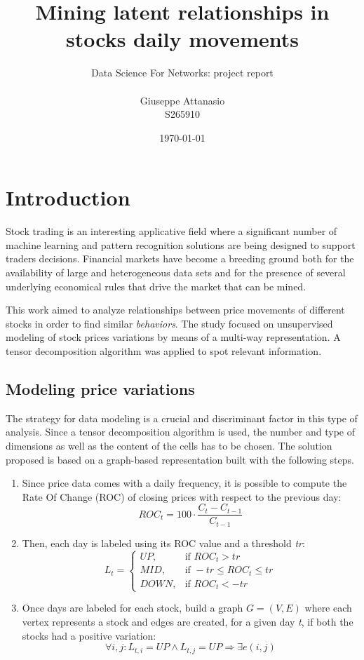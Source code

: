 \documentclass[12pt]{extarticle}
\title{Mining latent relationships in stocks daily movements}
\author{Data Science For Networks: project report\\\\Giuseppe Attanasio\\ S265910}
\date{\today}
\begin{document}
\maketitle
\newpage

\section{Introduction}

Stock trading is an interesting applicative field where a significant number of machine learning and pattern recognition solutions are being designed to support traders decisions. Financial markets have become a breeding ground both for the availability of large and heterogeneous data sets and for the presence of several underlying economical rules that drive the market that can be mined. 

This work aimed to analyze relationships between price movements of different stocks in order to find similar \textit{behaviors}. The study focused on unsupervised modeling of stock prices variations by means of a multi-way representation. A tensor decomposition algorithm was applied to spot relevant information. 

\subsection{Modeling price variations}

The strategy for data modeling is a crucial and discriminant factor in this type of analysis. Since a tensor decomposition algorithm is used, the number and type of dimensions as well as the content of the cells has to be chosen.
The solution proposed is based on a graph-based representation built with the following steps.

\begin{enumerate}
    \item Since price data comes with a daily frequency, it is possible to compute the Rate Of Change (ROC) of closing prices with respect to the previous day: 
    \begin{equation}
        ROC_t = 100 \cdot \frac{C_t - C_{t-1}}{C_{t-1}}
    \end{equation}
    \item Then, each day is labeled using its ROC value and a threshold \textit{tr}:
    $$
        L_t = 
    	\begin{cases}
    		UP, & \text{if } ROC_t > tr \\
    		MID, & \text{if } -tr \leq ROC_t \leq tr \\
    		DOWN, & \text{if } ROC_t < -tr
    	\end{cases}
    $$
    \item Once days are labeled for each stock, build a graph $G = (V,E)$ where each vertex represents a stock and edges are created, for a given day \textit{t}, if both the stocks had a positive variation:
    \begin{equation}
        \forall i,j: L_{t,i} = UP \wedge L_{t,j} = UP \Rightarrow \exists e(i,j)
    \end{equation}
\end{enumerate}
\end{document}
